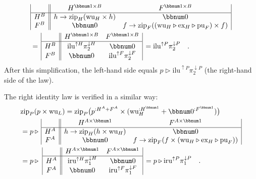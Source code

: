 \begin{align*}
 & \begin{array}{|c||cc|}
 & H^{\bbnum 1\times B} & F^{\bbnum 1\times B}\\
\hline H^{B} & h\rightarrow\text{zip}_{H}(\text{wu}_{H}\times h) & \bbnum 0\\
F^{B} & \bbnum 0 & f\rightarrow\text{zip}_{F}((\text{wu}_{H}\triangleright\text{ex}_{H}\triangleright\text{pu}_{F})\times f)
\end{array}\\
 & =\,\begin{array}{|c||cc|}
 & H^{\bbnum 1\times B} & F^{\bbnum 1\times B}\\
\hline H^{B} & \text{ilu}^{\uparrow H}\pi_{2}^{\downarrow H} & \bbnum 0\\
F^{B} & \bbnum 0 & \text{ilu}^{\uparrow F}\pi_{2}^{\downarrow F}
\end{array}\,=\text{ilu}^{\uparrow P}\pi_{2}^{\downarrow P}\quad.
\end{align*}
After this simplification, the left-hand side equals $p\triangleright\text{ilu}^{\uparrow P}\pi_{2}^{\downarrow P}$
(the right-hand side of the law).

The right identity law is verified in a similar way:
\begin{align*}
 & \text{zip}_{P}(p\times\text{wu}_{L})=\text{zip}_{P}\big(p^{:H^{A}+F^{A}}\times(\text{wu}_{H}^{:H^{\bbnum 1}}+\bbnum 0^{:F^{\bbnum 1}})\big)\\
 & =p\triangleright\,\begin{array}{|c||cc|}
 & H^{A\times\bbnum 1} & F^{A\times\bbnum 1}\\
\hline H^{A} & h\rightarrow\text{zip}_{H}(h\times\text{wu}_{H}) & \bbnum 0\\
F^{A} & \bbnum 0 & f\rightarrow\text{zip}_{F}(f\times(\text{wu}_{H}\triangleright\text{ex}_{H}\triangleright\text{pu}_{F}))
\end{array}\\
 & =p\triangleright\,\,\begin{array}{|c||cc|}
 & H^{A\times\bbnum 1} & F^{A\times\bbnum 1}\\
\hline H^{A} & \text{iru}^{\uparrow H}\pi_{1}^{\downarrow H} & \bbnum 0\\
F^{A} & \bbnum 0 & \text{iru}^{\uparrow F}\pi_{1}^{\downarrow F}
\end{array}\,=p\triangleright\text{iru}^{\uparrow P}\pi_{1}^{\downarrow P}\quad.
\end{align*}

